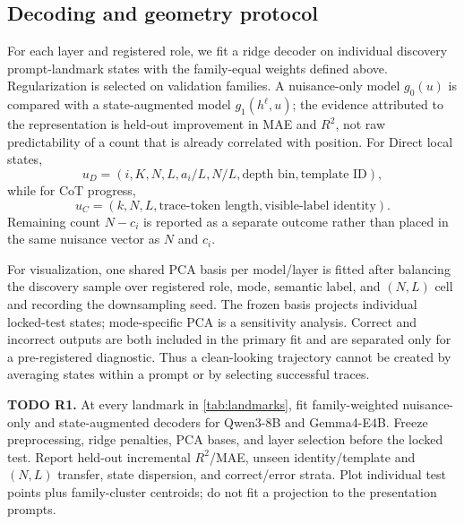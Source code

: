 \documentclass[10pt,twocolumn]{article}
\newcommand{\todoid}[2]{%
  \par\noindent\textcolor{red!75!black}{\textbf{TODO #1.} #2}\par}
\begin{document}
\subsection{Decoding and geometry protocol}
For each layer and registered role, we fit a ridge decoder on individual discovery
prompt-landmark states with the family-equal weights defined above. Regularization is selected
on validation families. A nuisance-only model $g_0(u)$ is compared with a state-augmented model
$g_1(h^\ell,u)$; the evidence attributed to the representation is held-out improvement in MAE
and $R^2$, not raw predictability of a count that is already correlated with position.
For Direct local states,
\[
 u_D=(i,K,N,L,a_i/L,N/L,\text{depth bin},\text{template ID}),
\]
while for CoT progress,
\[
 u_C=(k,N,L,\text{trace-token length},\text{visible-label identity}).
\]
Remaining count $N-c_i$ is reported as a separate outcome rather than placed in the same
nuisance vector as $N$ and $c_i$.

For visualization, one shared PCA basis per model/layer is fitted after balancing the discovery
sample over registered role, mode, semantic label, and $(N,L)$ cell and recording the
downsampling seed. The frozen basis projects
individual locked-test states; mode-specific PCA is a sensitivity analysis. Correct and
incorrect outputs are both included in the primary fit and are separated only for a
pre-registered diagnostic. Thus a clean-looking trajectory cannot be created by averaging
states within a prompt or by selecting successful traces.

\todoid{R1}{At every landmark in \cref{tab:landmarks}, fit family-weighted nuisance-only and
state-augmented decoders for Qwen3-8B and Gemma4-E4B. Freeze preprocessing, ridge penalties,
PCA bases, and layer selection before the locked test. Report held-out incremental $R^2$/MAE,
unseen identity/template and $(N,L)$ transfer, state dispersion, and correct/error strata.
Plot individual test points plus family-cluster centroids; do not fit a projection to the
presentation prompts.}
\end{document}

